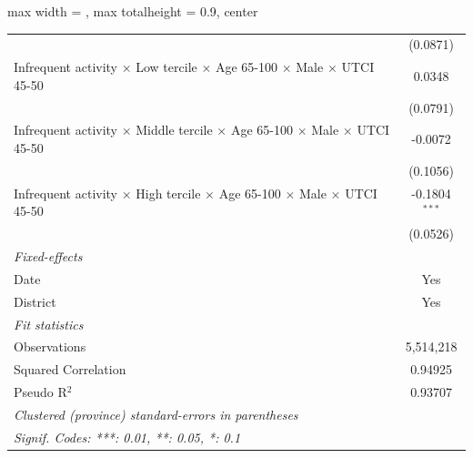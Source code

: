 \begin{table}[htbp]
\begin{adjustbox}{max width = \textwidth, max totalheight = 0.9\textheight, center}
\begin{tabular}{lc}
                                                                                                                 & (0.0871)\\   
         Infrequent activity $\times$ Low tercile $\times$ Age 65-100 $\times$ Male $\times$ UTCI 45-50          & 0.0348\\   
                                                                                                                 & (0.0791)\\   
         Infrequent activity $\times$ Middle tercile $\times$ Age 65-100 $\times$ Male $\times$ UTCI 45-50       & -0.0072\\   
                                                                                                                 & (0.1056)\\   
         Infrequent activity $\times$ High tercile $\times$ Age 65-100 $\times$ Male $\times$ UTCI 45-50         & -0.1804$^{***}$\\   
                                                                                                                 & (0.0526)\\   
         \midrule
         \emph{Fixed-effects}\\
         Date                                                                                                    & Yes\\  
         District                                                                                                & Yes\\  
         \midrule
         \emph{Fit statistics}\\
         Observations                                                                                            & 5,514,218\\  
         Squared Correlation                                                                                     & 0.94925\\  
         Pseudo R$^2$                                                                                            & 0.93707\\  
         \midrule \midrule
         \multicolumn{2}{l}{\emph{Clustered (province) standard-errors in parentheses}}\\
         \multicolumn{2}{l}{\emph{Signif. Codes: ***: 0.01, **: 0.05, *: 0.1}}\\
      \end{tabular}
   \end{adjustbox}
\end{table}


